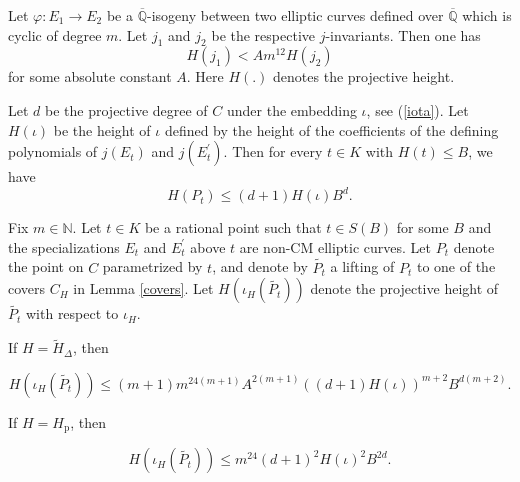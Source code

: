 \documentclass[10pt,a4paper]{amsart}
\newcommand{\N}{\mathbb{N}}
\newcommand{\Q}{\mathbb{Q}}
\begin{document}
\begin{cor}\label{pazc}
Let $\varphi: E_{1} \rightarrow E_{2}$ be a $\overline{\mathbb{Q}}$-isogeny between two elliptic curves defined over $\overline{\Q}$ which is cyclic of degree $m$. Let $j_{1}$ and $j_{2}$ be the respective $j$-invariants. Then one has
	$$H(j_{1}) < Am^{12}H(j_{2})$$
	for some absolute constant $A$. Here $H(.)$ denotes the projective height.
\end{cor}

\begin{lem}\label{5.3}
Let $d$ be the projective degree of $C$ under the embedding $\iota$, see (\ref{iota}). Let $H(\iota)$ be the height of $\iota$ defined by the height of the coefficients of the defining polynomials of $j(E_{t})$ and $j(E_{t}^{\prime}).$ Then for every $t \in K$ with $H(t) \le B$, we have
$$H(P_{t}) \le (d+1)H(\iota)B^{d}.$$	
\end{lem}

\begin{prop}\label{change of heights}

Fix $m \in \N$. Let $t \in K$ be a rational point such that $t \in S(B)$ for some $B$ and the specializations $E_t$ and $E^{\prime}_t$ above $t$ are non-CM elliptic curves. Let $P_{t}$ denote the point on $C$ parametrized by $t$, and denote by $\tilde{P_{t}}$ a lifting of $P_{t}$ to one of the covers $C_H$ in Lemma \ref{covers}. Let $H(\iota_{H}(\tilde{P_{t}}))$ denote the projective height of $\tilde{P_{t}}$ with respect to $\iota_{H}$. 

If  $H=\tilde{H}_{\Delta}$, then 

 $$H(\iota_{H}(\tilde{P_{t}})) \le (m+1)m^{24(m+1)}A^{2(m+1)}((d+1)H(\iota))^{m+2}B^{d(m+2)} .$$	

 
 If $H=H_{\operatorname{p}}$, then 

 $$H(\iota_{H}(\tilde{P_{t}})) \le  m^{24}(d+1)^{2}H(\iota)^{2}B^{2d} .$$	



\end{prop}
\end{document}
